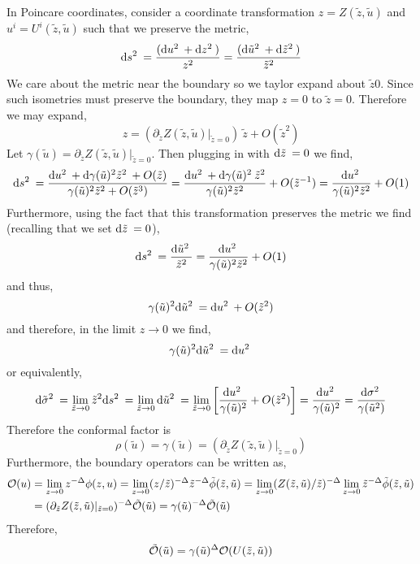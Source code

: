 \documentclass[12pt]{article}
\begin{document}
In Poincare coordinates, consider a coordinate transformation $z = Z(\tilde{z}, \tilde{u})$ and $u^i = U^i(\tilde{z}, \tilde{u})$ such that we preserve the metric,
\[ \mathrm{d}s^2 \: = \frac{(\mathrm{d}u^2 \: + \mathrm{d}z^2 \:)}{z^2} = \frac{(\mathrm{d}\tilde{u}^2 \: + \mathrm{d}\tilde{z}^2 \:)}{\tilde{z}^2} \]
We care about the metric near the boundary so we taylor expand about $\tilde{z} 0$. Since such isometries must preserve the boundary, they map $z = 0$ to $\tilde{z} = 0$. Therefore we may expand,
\[ z = (\partial_{\tilde{z}} Z(\tilde{z}, \tilde{u}) |_{\tilde{z} = 0}) \: \tilde{z} + O(\tilde{z}^2) \]
Let $\gamma(\tilde{u}) = \partial_{\tilde{z}} Z(\tilde{z}, \tilde{u}) |_{\tilde{z} = 0}$. Then plugging in with $\mathrm{d}\tilde{z} \: = 0$ we find,
\[ \mathrm{d}s^2 \: = \frac{\mathrm{d}u^2 \: + \mathrm{d}\gamma(\tilde{u})^2 \tilde{z}^2 \: + O(\tilde{z})}{\gamma(\tilde{u})^2 \tilde{z}^2 + O(\tilde{z}^3)} = \frac{\mathrm{d}u^2 \: + \mathrm{d}\gamma(\tilde{u})^2 \: \tilde{z}^2}{\gamma(\tilde{u})^2 \tilde{z}^2} + O(\tilde{z}^{-1}) = \frac{\mathrm{d}u^2 \:}{\gamma(\tilde{u})^2 \tilde{z}^2} + O(1)  \] 
Furthermore, using the fact that this transformation preserves the metric we find (recalling that we set $\mathrm{d}\tilde{z} \: = 0$),
\[ \mathrm{d}s^2 \: = \frac{\mathrm{d}\tilde{u}^2 \:}{\tilde{z}^2} = \frac{\mathrm{d}u^2 \:}{\gamma(\tilde{u})^2 \tilde{z}^2} + O(1)  \]
and thus,
\[ \gamma(\tilde{u})^2 \mathrm{d}\tilde{u}^2 \: = \mathrm{d}u^2 \: + O(\tilde{z}^2) \]
and therefore, in the limit $z \to 0$ we find,
\[ \gamma(\tilde{u})^2 \mathrm{d}\tilde{u}^2 \: = \mathrm{d}u^2 \: \]
or equivalently,
\[ \mathrm{d}\tilde{\sigma}^2 \: = \lim_{\tilde{z} \to 0} \tilde{z}^2 \mathrm{d}s^2 \: = \lim_{\tilde{z} \to 0} \mathrm{d}\tilde{u}^2 \: = \lim_{\tilde{z} \to 0} \left[ \frac{\mathrm{d}u^2 \:}{\gamma(\tilde{u})^2} + O(\tilde{z}^2) \right] = \frac{\mathrm{d}u^2 \:}{\gamma(\tilde{u})^2} = \frac{\mathrm{d}\sigma^2 \:}{\gamma(\tilde{u}^2)} \] 
Therefore the conformal factor is 
\[ \rho(\tilde{u}) = \gamma(\tilde{u}) = (\partial_{\tilde{z}} Z(\tilde{z}, \tilde{u}) |_{\tilde{z} = 0}) \]
Furthermore, the boundary operators can be written as,
\begin{align*}
\mathcal{O}(u) & = \lim_{z \to 0} z^{-\Delta} \phi(z, u) = \lim_{z \to 0} (z / \tilde{z})^{-\Delta} \tilde{z}^{-\Delta} \tilde{\phi}(\tilde{z}, \tilde{u}) = \lim_{z \to 0} (Z(\tilde{z}, \tilde{u}) / \tilde{z})^{-\Delta} \lim_{z \to 0} \tilde{z}^{-\Delta} \tilde{\phi}(\tilde{z}, \tilde{u}) 
\\
& = (\partial_{\tilde{z}} Z(\tilde{z}, \tilde{u})|_{\tilde{z} = 0})^{-\Delta} \tilde{\mathcal{O}}(\tilde{u}) = \gamma(\tilde{u})^{- \Delta} \tilde{\mathcal{O}}(\tilde{u})
\end{align*}
Therefore,
\[ \tilde{\mathcal{O}}(\tilde{u}) = \gamma(\tilde{u})^{\Delta} \mathcal{O}(U(\tilde{z}, \tilde{u})) \]
\end{document}
